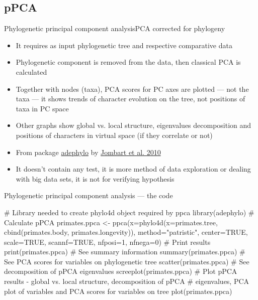 \documentclass[compress, ucs, xelatex, 11pt, xcolor=svgnames, aspectratio=169,
	hyperref={
		bookmarks=true,
		unicode=true,
		colorlinks=true,
		pdftitle={Molecular data in R},
		plainpages=false,
		pdfauthor={Vojtech Zeisek},
		pdfsubject={Course about phylogeny and evolution in R},
		pdfcreator={XeLaTeX},
		pdfkeywords={R, evolution, phylogeny, molecular data},
		linkcolor=Crimson, %
		anchorcolor=Magenta, %
		citecolor=Magenta, %
		filecolor=Magenta, %
		menucolor=Magenta, %
		urlcolor=DodgerBlue, %
		pdftex},
	url={hyphens, lowtilde} %
	]{beamer}
\begin{document}
\subsection{pPCA}

\begin{frame}{Phylogenetic principal component analysis}{PCA corrected for phylogeny}
	\begin{itemize}
		\item It requires as input phylogenetic tree and respective comparative data
		\item Phylogenetic component is removed from the data, then classical PCA is calculated
		\item Together with nodes (taxa), PCA scores for PC axes are plotted --- not the taxa --- it shows trends of character evolution on the tree, not positions of taxa in PC space
		\item Other graphs show global vs. local structure, eigenvalues decomposition and positions of characters in virtual space (if they correlate or not)
		\item From package \href{https://academic.oup.com/bioinformatics/article/26/15/1907/188748}{adephylo} by \href{https://www.sciencedirect.com/science/article/pii/S0022519310001736}{Jombart et al. 2010}
		\item It doesn't contain any test, it is more method of data exploration or dealing with big data sets, it is not for verifying hypothesis
	\end{itemize}
\end{frame}

\begin{frame}[fragile]{Phylogenetic principal component analysis --- the code}
	\begin{spluscode}
    # Library needed to create phylo4d object required by ppca
    library(adephylo)
    # Calculate pPCA
    primates.ppca <- ppca(x=phylo4d(x=primates.tree, cbind(primates.body,
      primates.longevity)), method="patristic", center=TRUE, scale=TRUE,
      scannf=TRUE, nfposi=1, nfnega=0)
    # Print results
    print(primates.ppca)
    # See summary information
    summary(primates.ppca)
    # See PCA scores for variables on phylogenetic tree
    scatter(primates.ppca)
    # See decomposition of pPCA eigenvalues
    screeplot(primates.ppca)
    # Plot pPCA results - global vs. local structure, decomposition of pPCA
    # eigenvalues, PCA plot of variables and PCA scores for variables on tree
    plot(primates.ppca)
	\end{spluscode}
\end{frame}
\end{document}
